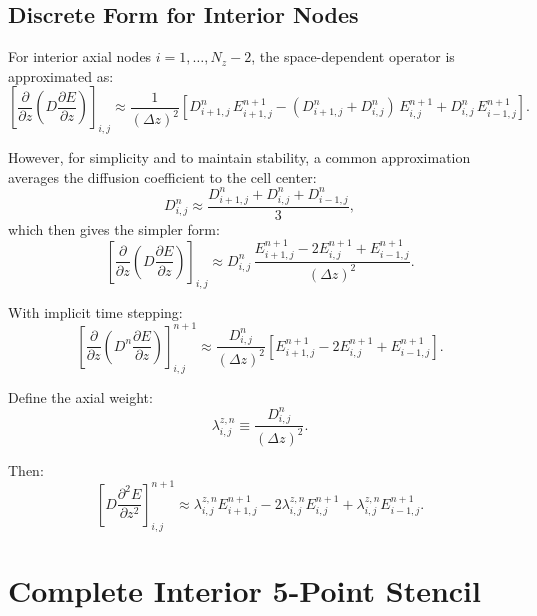 \documentclass[12pt,oneside]{article}
\begin{document}
\subsection{Discrete Form for Interior Nodes}

For interior axial nodes $i = 1, \ldots, N_z - 2$, the space-dependent operator is approximated as:
\begin{equation}
\left[\frac{\partial}{\partial z}\left(D\frac{\partial E}{\partial z}\right)\right]_{i,j}
\approx
\frac{1}{(\Delta z)^2}\left[D^n_{i+1,j}\,E^{n+1}_{i+1,j} - (D^n_{i+1,j} + D^n_{i,j})\,E^{n+1}_{i,j} + D^n_{i,j}\,E^{n+1}_{i-1,j}\right].
\end{equation}

However, for simplicity and to maintain stability, a common approximation averages the diffusion coefficient to the cell center:
\begin{equation}
D^n_{i,j} \approx \frac{D^n_{i+1,j} + D^n_{i,j} + D^n_{i-1,j}}{3},
\end{equation}
which then gives the simpler form:
\begin{equation}
\left[\frac{\partial}{\partial z}\left(D\frac{\partial E}{\partial z}\right)\right]_{i,j}
\approx
D^n_{i,j}\,\frac{E^{n+1}_{i+1,j} - 2E^{n+1}_{i,j} + E^{n+1}_{i-1,j}}{(\Delta z)^2}.
\end{equation}

With implicit time stepping:
\begin{equation}
\left[\frac{\partial}{\partial z}\left(D^n\frac{\partial E}{\partial z}\right)\right]_{i,j}^{n+1}
\approx
\frac{D^n_{i,j}}{(\Delta z)^2}
\left[E^{n+1}_{i+1,j} - 2E^{n+1}_{i,j} + E^{n+1}_{i-1,j}\right].
\end{equation}

Define the axial weight:
\begin{equation}
\lambda^{z,n}_{i,j}
\equiv
\frac{D^n_{i,j}}{(\Delta z)^2}.
\end{equation}

Then:
\begin{equation}
\left[D\frac{\partial^2 E}{\partial z^2}\right]_{i,j}^{n+1}
\approx
\lambda^{z,n}_{i,j} E^{n+1}_{i+1,j}
-
2\lambda^{z,n}_{i,j} E^{n+1}_{i,j}
+
\lambda^{z,n}_{i,j} E^{n+1}_{i-1,j}.
\label{eq:axial_stencil}
\end{equation}

\section{Complete Interior 5-Point Stencil}
\end{document}
